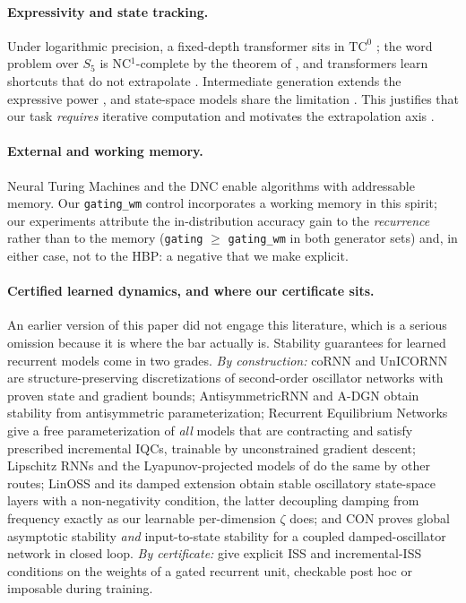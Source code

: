 \documentclass{article}
\begin{document}
\paragraph{Expressivity and state tracking.}
Under logarithmic precision, a fixed-depth transformer sits in $\mathrm{TC}^0$
\citep{merrill2023parallelism}; the word problem over $S_5$ is NC$^1$-complete by
the theorem of \citet{barrington1989}, and transformers learn shortcuts that do not
extrapolate \citep{liu2023shortcuts}. Intermediate generation extends the
expressive power \citep{merrill2024cot}, and state-space models share the
limitation \citep{merrill2024illusion}. This justifies that our task
\emph{requires} iterative computation and motivates the extrapolation axis
\citep{anil2022length,jelassi2023arithmetic}.

\paragraph{External and working memory.}
Neural Turing Machines \citep{graves2014ntm} and the DNC \citep{graves2016dnc}
enable algorithms with addressable memory. Our \texttt{gating\_wm} control
incorporates a working memory in this spirit; our experiments attribute the
in-distribution accuracy gain to the \emph{recurrence} rather than to the
memory (\texttt{gating} $\ge$ \texttt{gating\_wm} in both generator sets) and,
in either case, not to the HBP: a negative that we
make explicit.

\paragraph{Certified learned dynamics, and where our certificate sits.}
An earlier version of this paper did not engage this literature, which is a
serious omission because it is where the bar actually is. Stability guarantees
for learned recurrent models come in two grades. \emph{By construction:}
coRNN and UnICORNN \citep{rusch2021cornn,rusch2021unicornn} are
structure-preserving discretizations of second-order oscillator networks with
proven state and gradient bounds; AntisymmetricRNN
\citep{chang2019antisymmetricrnn} and A-DGN \citep{gravina2023adgn} obtain
stability from antisymmetric parameterization; Recurrent Equilibrium Networks
\citep{revay2024recurrent} give a free parameterization of \emph{all} models
that are contracting and satisfy prescribed incremental IQCs, trainable by
unconstrained gradient descent; Lipschitz RNNs \citep{erichson2021lipschitz}
and the Lyapunov-projected models of \citet{kolter2019learning} do the same by
other routes; LinOSS \citep{rusch2025oscillatory} and its damped extension
\citep{boyer2025dissipate} obtain stable oscillatory state-space layers with a
non-negativity condition, the latter decoupling damping from frequency exactly
as our learnable per-dimension $\zeta$ does; and CON \citep{stolzle2024con}
proves global asymptotic stability \emph{and} input-to-state stability for a
coupled damped-oscillator network in closed loop. \emph{By certificate:}
\citet{bonassi2021stability} give explicit ISS and incremental-ISS conditions
on the weights of a gated recurrent unit, checkable post hoc or imposable
during training.
\end{document}
